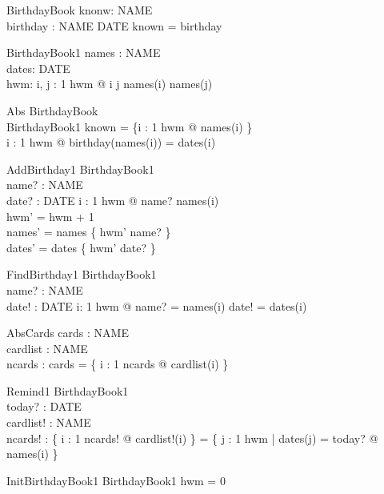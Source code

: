 \documentclass{llncs}
\begin{document}
\begin{schema}{BirthdayBook}
knonw: \power NAME \\
birthday : NAME \pfun DATE
\where
known = \dom birthday
\end{schema}
\begin{schema}{BirthdayBook1}
names : \nat \fun NAME \\
dates: \nat \fun DATE \\
hwm: \nat
\where
\forall i, j : 1 \upto hwm @ i \neq j \implies names(i) \neq names(j)
\end{schema}
\begin{schema}{Abs}
BirthdayBook \\
BirthdayBook1 
\where
known = \{i : 1 \upto hwm @ names(i) \} \\
\forall i : 1 \upto hwm @ birthday(names(i)) = dates(i)
\end{schema}

\begin{schema}{AddBirthday1}
\Delta BirthdayBook1 \\
name? : NAME \\
date? : DATE
\where
\forall i : 1 \upto hwm @ name? \neq names(i) \\
hwm' = hwm + 1 \\
names' = names \oplus \{ hwm' \mapsto name? \} \\
dates' = dates \oplus \{ hwm' \mapsto date? \}
\end{schema}

\begin{schema}{FindBirthday1}
\Xi BirthdayBook1 \\
name? : NAME \\
date! : DATE
\where 
\exists i: 1 \upto hwm @ name? = names(i) \land date! = dates(i)
\end{schema}

\begin{schema}{AbsCards}
cards : \power NAME \\
cardlist : \nat \fun NAME \\
ncards : \nat
\where 
cards = \{ i : 1 \upto ncards @ cardlist(i) \}
\end{schema}

\begin{schema}{Remind1}
\Xi BirthdayBook1 \\
today? : DATE \\
cardlist! : \nat \fun NAME \\
ncards! : \nat
\where 
\{ i : 1 \upto ncards! @ cardlist!(i) \} = \{ j : 1 \upto hwm | dates(j) = today? @ names(i) \}
\end{schema}
\begin{schema}{InitBirthdayBook1}
BirthdayBook1
\where
hwm = 0
\end{schema}
\end{document}
